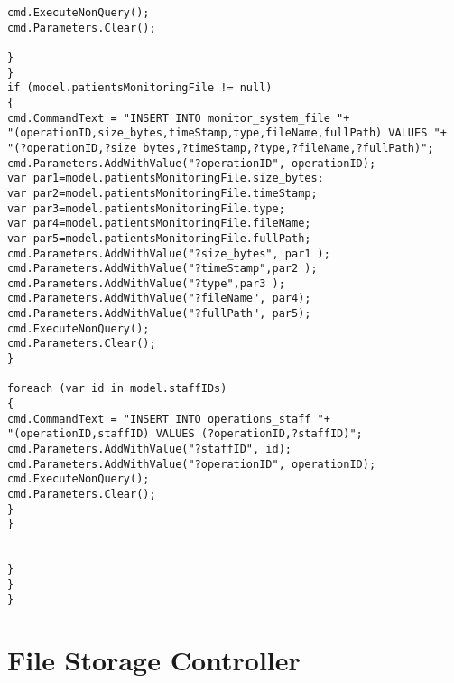 \begin{lstlisting}
cmd.ExecuteNonQuery();
cmd.Parameters.Clear();

}
}
if (model.patientsMonitoringFile != null)
{
cmd.CommandText = "INSERT INTO monitor_system_file "+
"(operationID,size_bytes,timeStamp,type,fileName,fullPath) VALUES "+
"(?operationID,?size_bytes,?timeStamp,?type,?fileName,?fullPath)";
cmd.Parameters.AddWithValue("?operationID", operationID);
var par1=model.patientsMonitoringFile.size_bytes;
var par2=model.patientsMonitoringFile.timeStamp;
var par3=model.patientsMonitoringFile.type;
var par4=model.patientsMonitoringFile.fileName;
var par5=model.patientsMonitoringFile.fullPath;
cmd.Parameters.AddWithValue("?size_bytes", par1 );
cmd.Parameters.AddWithValue("?timeStamp",par2 );
cmd.Parameters.AddWithValue("?type",par3 );
cmd.Parameters.AddWithValue("?fileName", par4);
cmd.Parameters.AddWithValue("?fullPath", par5);
cmd.ExecuteNonQuery();
cmd.Parameters.Clear();
}

foreach (var id in model.staffIDs)
{
cmd.CommandText = "INSERT INTO operations_staff "+
"(operationID,staffID) VALUES (?operationID,?staffID)";
cmd.Parameters.AddWithValue("?staffID", id);
cmd.Parameters.AddWithValue("?operationID", operationID);
cmd.ExecuteNonQuery();
cmd.Parameters.Clear();
}
}


}
}
}
\end{lstlisting}

\section{File Storage Controller}


